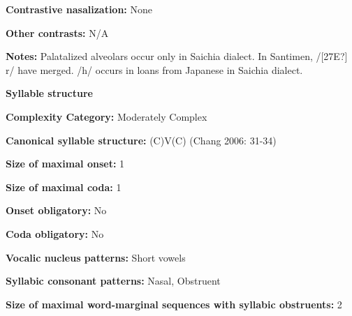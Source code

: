 \begin{styleBody}
\textbf{Contrastive nasalization:} None
\end{styleBody}

\begin{styleBody}
\textbf{Other contrasts:} N/A
\end{styleBody}

\begin{styleBody}
\textbf{Notes:} Palatalized alveolars occur only in Saichia dialect. In Santimen, /[27E?] r/ have merged. /h/ occurs in loans from Japanese in Saichia dialect.
\end{styleBody}

\begin{styleBody}
\textbf{Syllable structure}
\end{styleBody}

\begin{styleBody}
\textbf{Complexity Category:} Moderately Complex
\end{styleBody}

\begin{styleBody}
\textbf{Canonical syllable structure:} (C)V(C) (Chang 2006: 31-34)
\end{styleBody}

\begin{styleBody}
\textbf{Size of maximal onset:} 1
\end{styleBody}

\begin{styleBody}
\textbf{Size of maximal coda: }1
\end{styleBody}

\begin{styleBody}
\textbf{Onset obligatory:} No
\end{styleBody}

\begin{styleBody}
\textbf{Coda obligatory:} No
\end{styleBody}

\begin{styleBody}
\textbf{Vocalic nucleus patterns: }Short vowels
\end{styleBody}

\begin{styleBody}
\textbf{Syllabic consonant patterns:} Nasal, Obstruent
\end{styleBody}

\begin{styleBody}
\textbf{Size of maximal word{}-marginal sequences with syllabic obstruents:} 2
\end{styleBody}

